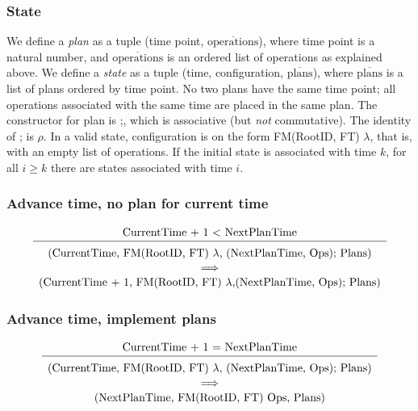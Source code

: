 \documentclass[a4paper,english]{ifimaster}
\begin{document}
\subsubsection*{State}
We define a \textit{plan} as a tuple (time point, $\overline{\text{operations}}$), where time point is a natural number, and $\overline{\text{operations}}$ is an ordered list of operations as explained above. 
We define a \textit{state} as a tuple (time, configuration, $\overline{\text{plans}}$), where $\overline{\text{plans}}$ is a list of plans ordered by time point. No two plans have the same time point; all operations associated with the same time are placed in the same plan. The constructor for plan is ;, which is associative (but \textit{not} commutative). The identity of ; is $\rho$. In a valid state, configuration is on the form FM(RootID, FT) $\lambda$, that is, with an empty list of operations. If the initial state is associated with time $k$, for all $i \geq k$ there are states associated with time $i$.

\subsubsection*{Advance time, no plan for current time}
\begin{equation*}
    \begin{array}{c}
    \text{CurrentTime + 1 $<$ NextPlanTime}\\[1pt]
    \hline\\[-7pt]
    \text{(CurrentTime, FM(RootID, FT) $\lambda$, (NextPlanTime, Ops); Plans)}\\[1pt]
    \implies \\[1pt]
    \text{(CurrentTime + 1, FM(RootID, FT) $\lambda$,(NextPlanTime, Ops); Plans)}
    \end{array}
\end{equation*}

\subsubsection*{Advance time, implement plans}
\begin{equation*}
    \begin{array}{c}
    \text{CurrentTime + 1 = NextPlanTime}\\[1pt]
    \hline\\[-7pt]
    \text{(CurrentTime, FM(RootID, FT) $\lambda$, (NextPlanTime, Ops); Plans)}\\[1pt]
    \implies \\[1pt]
    \text{(NextPlanTime, FM(RootID, FT) Ops, Plans)}
    \end{array}
\end{equation*}
\end{document}
